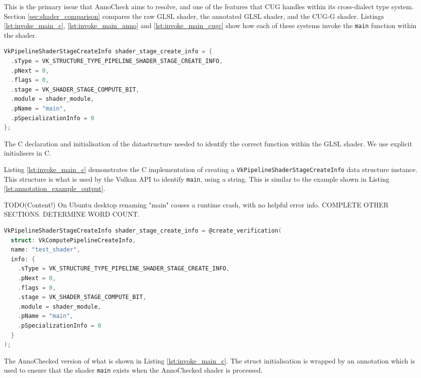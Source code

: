 \documentclass[a4paper,12pt,twoside,openright]{report}
\begin{document}
This is the primary issue that AnnoCheck aims to resolve, and one of the
features that CUG handles within its cross-dialect type system. Section
\ref{sec:shader_comparison} compares the raw GLSL shader, the annotated GLSL
shader, and the CUG-G shader. Listings \ref{lst:invoke_main_c},
\ref{lst:invoke_main_anno} and \ref{lst:invoke_main_cugc} show how each of
these systems invoke the \texttt{main} function within the shader.

\begin{lstfloat}
\begin{lstlisting}[language=C]
VkPipelineShaderStageCreateInfo shader_stage_create_info = {
  .sType = VK_STRUCTURE_TYPE_PIPELINE_SHADER_STAGE_CREATE_INFO,
  .pNext = 0,
  .flags = 0,
  .stage = VK_SHADER_STAGE_COMPUTE_BIT,
  .module = shader_module,
  .pName = "main",
  .pSpecializationInfo = 0
};
\end{lstlisting}
\caption{The C declaration and initialisation of the datastructure needed to
identify the correct function within the GLSL shader. We use explicit initialisers
in C\cite{TODO}.}
\label{lst:invoke_main_c}
\end{lstfloat}

Listing \ref{lst:invoke_main_c} demonstrates the C implementation of creating a
\texttt{VkPipelineShaderStageCreateInfo} data structure instance. This
structure is what is used by the Vulkan API to identify \texttt{main}, using a
string. This is similar to the example shown in Listing
\ref{lst:annotation_example_output}.

TODO(Content!) On Ubuntu desktop renaming "main" causes a runtime crash, with
no helpful error info. COMPLETE OTHER SECTIONS. DETERMINE WORD COUNT.

\begin{lstfloat}
\begin{lstlisting}[language=C]
VkPipelineShaderStageCreateInfo shader_stage_create_info = @create_verification(
  struct: VkComputePipelineCreateInfo,
  name: "test_shader",
  info: {
    .sType = VK_STRUCTURE_TYPE_PIPELINE_SHADER_STAGE_CREATE_INFO,
    .pNext = 0,
    .flags = 0,
    .stage = VK_SHADER_STAGE_COMPUTE_BIT,
    .module = shader_module,
    .pName = "main",
    .pSpecializationInfo = 0
  }
);
\end{lstlisting}
\caption{The AnnoChecked version of what is shown in Listing
\ref{lst:invoke_main_c}. The struct initialisation is wrapped by an annotation
which is used to ensure that the shader \texttt{main} exists when the
AnnoChecked shader is processed.}
\label{lst:invoke_main_anno}
\end{lstfloat}
\end{document}
